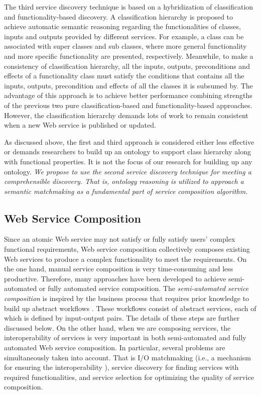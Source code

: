 The third service discovery technique is based on a hybridization of classification and functionality-based discovery. A classification hierarchy is proposed to achieve automatic semantic reasoning regarding the functionalities of classes, inputs and outputs provided by different services. For example, a class can be associated with super classes and sub classes, where more general functionality and more specific functionality are presented,  respectively. Meanwhile, to make a consistency of classification hierarchy, all the inputs, outputs, preconditions and effects of a functionality class must satisfy the conditions that contains all the inputs, outputs, precondition and effects of all the classes it is subsumed by. The advantage of this approach is to achieve better performance combining strengths of the previous two pure classification-based and functionality-based approaches. However, the classification hierarchy demands lots of work to remain consistent when a new Web service is published or updated.​

As discussed above, the first and third approach is considered either less effective or demands researchers to build up an ontology to support class hierarchy along with functional properties. It is not the focus of our research for building up any ontology.  \emph{We propose to use the second service discovery technique for meeting a comprehensible discovery. That is, ontology reasoning is utilized to approach a semantic matchmaking as a fundamental part of service composition algorithm.}



\subsection{Web Service Composition}\label{servicecomposition}

Since an atomic Web service may not satisfy or fully satisfy users' complex functional requirements, Web service composition collectively composes existing Web services to produce a complex functionality to meet the requirements. On the one hand, manual service composition is very time-consuming and less productive. Therefore, many approaches have been developed to achieve semi-automated or fully automated service composition. The \emph{semi-automated service composition} is inspired by the business process that requires prior knowledge to build up abstract workflows \cite{moghaddam2014service}. These workflows consist of abstract services, each of which is defined by input-output pairs. The details of these steps are further discussed below. On the other hand, when we are composing services, the interoperability of services is very important in both semi-automated and fully automated Web service composition. In particular, several problems are simultaneously taken into account. That is I/O matchmaking (i.e., a mechanism for ensuring the interoperability ), service discovery for finding services with required functionalities, and service selection for optimizing the quality of service composition. 


